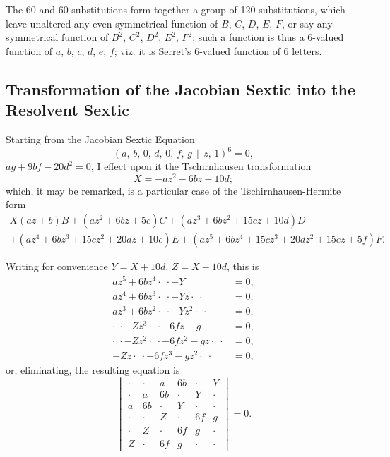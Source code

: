 \documentclass[11pt,a4paper]{book}
\begin{document}
The 60 and 60 substitutions form together a group of 120 substitutions, which leave unaltered any even symmetrical function of $B$, $C$, $D$, $E$, $F$, or say any symmetrical function of $B^{2}$, $C^{2}$, $D^{2}$, $E^{2}$, $F^{2}$; such a function is thus a 6-valued function of $a$, $b$, $c$, $d$, $e$, $f$; viz. it is Serret's 6-valued function of 6 letters.

\subsection*{Transformation of the Jacobian Sextic into the Resolvent Sextic}

Starting from the Jacobian Sextic Equation
\[
(a,\, b,\, 0,\, d,\, 0,\, f,\, g \,\!\!\mid\!\!\, z,\, 1)^{6} = 0,
\]
$ag + 9bf - 20d^{2} = 0$, I effect upon it the Tschirnhausen transformation
\[
X = -az^{2} - 6bz - 10d;
\]
which, it may be remarked, is a particular case of the Tschirnhausen-Hermite form
\begin{multline*}
X(az+b)B + (az^{2}+6bz+5c)C + (az^{3}+6bz^{2}+15cz+10d)D\\
+ (az^{4}+6bz^{3}+15cz^{2}+20dz+10e)E + (az^{5}+6bz^{4}+15cz^{3}+20dz^{2}+15ez+5f)F.
\end{multline*}

Writing for convenience $Y = X+10d$, $Z = X-10d$, this is
\begin{align*}
az^{5} + 6bz^{4} \cdot\;\cdot + Y &= 0,\\
az^{4} + 6bz^{3} \cdot\;\cdot + Yz \cdot\;\cdot &= 0,\\
az^{3} + 6bz^{2} \cdot\;\cdot + Yz^{2} \cdot\;\cdot &= 0,\\
\cdot\;\cdot - Zz^{3} \cdot\;\cdot - 6fz - g &= 0,\\
\cdot\;\cdot - Zz^{2} \cdot\;\cdot - 6fz^{2} - gz \cdot\;\cdot &= 0,\\
-Zz \cdot\;\cdot - 6fz^{3} - gz^{2} \cdot\;\cdot &= 0,
\end{align*}
or, eliminating, the resulting equation is
\[
\begin{vmatrix}
\cdot & \cdot & a & 6b & \cdot & Y \\
\cdot & a & 6b & \cdot & Y & \cdot \\
a & 6b & \cdot & Y & \cdot & \cdot \\
\cdot & \cdot & Z & \cdot & 6f & g \\
\cdot & Z & \cdot & 6f & g & \cdot \\
Z & \cdot & 6f & g & \cdot & \cdot
\end{vmatrix} = 0.
\]
\end{document}
